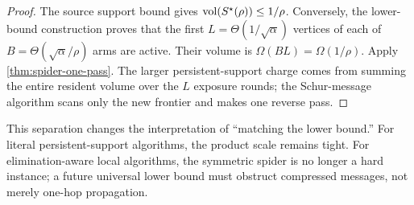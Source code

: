 \begin{proof}
The source support bound gives
$\operatorname{vol}(S^\star(\rho))\leq1/\rho$.  Conversely, the lower-bound construction
proves that the first
$L=\Theta(1/\sqrt\alpha)$ vertices of each of
$B=\Theta(\sqrt\alpha/\rho)$ arms are active.  Their volume is
$\Omega(BL)=\Omega(1/\rho)$.  Apply \cref{thm:spider-one-pass}.  The larger
persistent-support charge comes from summing the entire resident volume over
the $L$ exposure rounds; the Schur-message algorithm scans only the new
frontier and makes one reverse pass.
\end{proof}

This separation changes the interpretation of ``matching the lower bound.''
For literal persistent-support algorithms, the product scale remains tight.
For elimination-aware local algorithms, the symmetric spider is no longer a
hard instance; a future universal lower bound must obstruct compressed
messages, not merely one-hop propagation.
